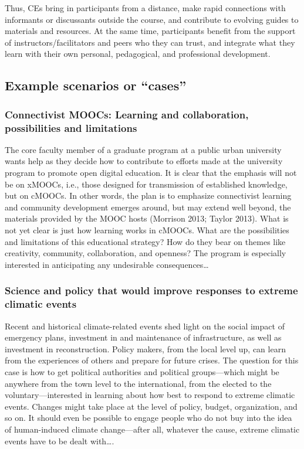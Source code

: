 Thus, CEs bring in participants from a distance, make rapid connections
with informants or discussants outside the course, and contribute to
evolving guides to materials and resources. At the same time,
participants benefit from the support of instructors/facilitators and
peers who they can trust, and integrate what they learn with their own
personal, pedagogical, and professional development.

\subsection{Example scenarios or
``cases''}\label{example-scenarios-or-cases}

\subsubsection{Connectivist MOOCs: Learning and collaboration,
possibilities and
limitations}\label{connectivist-moocs-learning-and-collaboration-possibilities-and-limitations}

The core faculty member of a graduate program at a public urban
university wants help as they decide how to contribute to efforts made
at the university program to promote open digital education. It is clear
that the emphasis will not be on xMOOCs, i.e., those designed for
transmission of established knowledge, but on cMOOCs. In other words,
the plan is to emphasize connectivist learning and community development
emerges around, but may extend well beyond, the materials provided by
the MOOC hosts (Morrison 2013; Taylor 2013). What is not yet clear is
just how learning works in cMOOCs. What are the possibilities and
limitations of this educational strategy? How do they bear on themes
like creativity, community, collaboration, and openness? The program is
especially interested in anticipating any undesirable
consequences\ldots{}

\subsubsection{Science and policy that would improve responses to
extreme climatic
events}\label{science-and-policy-that-would-improve-responses-to-extreme-climatic-events}

Recent and historical climate-related events shed light on the social
impact of emergency plans, investment in and maintenance of
infrastructure, as well as investment in reconstruction. Policy makers,
from the local level up, can learn from the experiences of others and
prepare for future crises. The question for this case is how to get
political authorities and political groups---which might be anywhere
from the town level to the international, from the elected to the
voluntary---interested in learning about how best to respond to extreme
climatic events. Changes might take place at the level of policy,
budget, organization, and so on. It should even be possible to engage
people who do not buy into the idea of human-induced climate
change---after all, whatever the cause, extreme climatic events have to
be dealt with\ldots{}.

